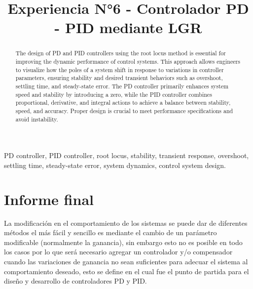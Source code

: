 \documentclass[conference]{IEEEtran}
\begin{document}
	
	\title{Experiencia N°6 - Controlador PD - PID mediante LGR}
	
	\author{
		\and
		\and
	}
	\maketitle
	
	\begin{abstract}
		The design of PD and PID controllers using the root locus method is essential for improving the dynamic performance of control systems. This approach allows engineers to visualize how the poles of a system shift in response to variations in controller parameters, ensuring stability and desired transient behaviors such as overshoot, settling time, and steady-state error. The PD controller primarily enhances system speed and stability by introducing a zero, while the PID controller combines proportional, derivative, and integral actions to achieve a balance between stability, speed, and accuracy. Proper design is crucial to meet performance specifications and avoid instability.
	\end{abstract}
	
	\begin{IEEEkeywords}
		PD controller, PID controller, root locus, stability, transient response, overshoot, settling time, steady-state error, system dynamics, control system design.
	\end{IEEEkeywords}
	
	\section{Informe final}
	La modificación en el comportamiento de los sistemas se puede dar de diferentes métodos el más fácil y sencillo es mediante el cambio de un parámetro modificable (normalmente la ganancia), sin embargo esto no es posible en todo los casos por lo que será necesario agregar un controlador y/o compensador cuando las variaciones de ganancia no sean suficientes para adecuar el sistema al comportamiento deseado, esto se define en \cite{ogata2015} el cual fue el punto de partida para el diseño y desarrollo de controladores PD y PID.
	
\end{document}
